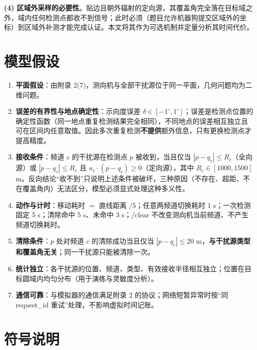 \documentclass[withoutpreface,bwprint]{cumcmthesis}
\begin{document}
\textbf{(4) 区域外采样的必要性}。贴边且朝外辐射的定向源，其覆盖角完全落在目标域之外，域内任何检测点都收不到信号；此时必须（题目允许机器狗提交区域外的坐标）到区域外补测才能完成认证。本文将其作为可选机制并定量分析其时间代价。

\section{模型假设}

\begin{enumerate}
  \item \textbf{平面假设}：由附录 2(7)，测向机与全部干扰源位于同一平面，几何问题均为二维问题。
  \item \textbf{误差的有界性与地点确定性}：示向度误差 $\delta\in[-1^{\circ},1^{\circ}]$；误差是检测点位置的确定性函数（同一地点重复检测结果完全相同），不同地点的误差相互独立且可在区间内任意取值。因此多次重复检测\textbf{不提供}额外信息，只有更换检测点才提高精度。
  \item \textbf{接收条件}：频道 $c$ 的干扰源在检测点 $p$ 被收到，当且仅当 $|p-q_c|\le R_c$（全向源）或 $|p-q_c|\le R_c$ 且 $u_c\cdot(p-q_c)\ge0$（定向源），其中 $R_c\in[1000,1500]$ m。反向结论“收不到”只说明上述条件被破坏，三种原因（不存在、超距、不在覆盖角内）无法区分，模型必须显式处理这种多义性。
  \item \textbf{动作与计时}：移动耗时 $=$ 直线距离 $/5$；任意两频道切换耗时 1 s；一次检测固定 5 s；清除命中 5 s、未命中 3 s；$\text{/clear}$ 不改变测向机当前频道、不产生频道切换耗时。
  \item \textbf{清除条件}：$p$ 处对频道 $c$ 的清除成功当且仅当 $|p-q_c|\le20$ m，\textbf{与干扰源类型和覆盖角无关}；同一干扰源只能被清除一次。
  \item \textbf{统计独立}：各干扰源的位置、频道、类型、有效接收半径相互独立；位置在目标圆域内均匀分布（用于演练与灵敏度分析）。
  \item \textbf{通信可靠}：与模拟器的通信满足附录 2 的协议；网络短暂异常时按“同 request\_id 重试”处理，不影响虚拟时间记账。
\end{enumerate}

\section{符号说明}
\end{document}
